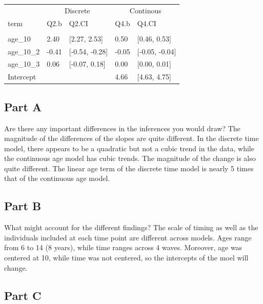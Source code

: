 \documentclass[]{article}
\begin{document}
\begin{table}[H]
\centering
\begin{tabular}{lllll}
\toprule
\multicolumn{1}{c}{ } & \multicolumn{2}{c}{Discrete} & \multicolumn{2}{c}{Continous} \\
\cmidrule(l{2pt}r{2pt}){2-3} \cmidrule(l{2pt}r{2pt}){4-5}
term & Q2.b & Q2.CI & Q4.b & Q4.CI\\
\midrule
\addlinespace[0.3em]
\multicolumn{5}{l}{\textbf{Fixed}}\\
\hspace{1em}age\_10 & 2.40 & [2.27, 2.53] & 0.50 & [0.46, 0.53]\\
\hspace{1em}age\_10\_2 & -0.41 & [-0.54, -0.28] & -0.05 & [-0.05, -0.04]\\
\hspace{1em}age\_10\_3 & 0.06 & [-0.07, 0.18] & 0.00 & [0.00, 0.01]\\
\hspace{1em}Intercept &  &  & 4.66 & [4.63, 4.75]\\
\bottomrule
\end{tabular}
\end{table}

\subsection{Part A}\label{part-a-2}

Are there any important differences in the inferences you would draw?
The magnitude of the differences of the slopes are quite different. In
the discrete time model, there appears to be a quadratic but not a cubic
trend in the data, while the continuous age model has cubic trends. The
magnitude of the change is also quite different. The linear age term of
the discrete time model is nearly 5 times that of the continuous age
model.

\subsection{Part B}\label{part-b-2}

What might account for the different findings? The scale of timing as
well as the individuals included at each time point are different across
models. Ages range from 6 to 14 (8 years), while time ranges across 4
waves. Moreover, age was centered at 10, while time was not centered, so
the intercepts of the moel will change.

\subsection{Part C}\label{part-c-1}
\end{document}
